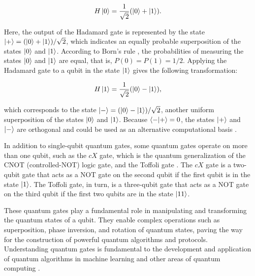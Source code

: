 
\begin{equation}
H\ket{0} = \frac{1}{\sqrt{2}}(\ket{0} + \ket{1}).
\end{equation}

\noindent Here, the output of the Hadamard gate is represented by the state $\ket{+} = (\ket{0} + \ket{1})/\sqrt{2}$, which indicates an equally probable superposition of the states $\ket{0}$ and $\ket{1}$. According to Born's rule \cite{Nielsen}, the probabilities of measuring the states $\ket{0}$ and $\ket{1}$ are equal, that is, $P(0) = P(1) = 1/2$. Applying the Hadamard gate to a qubit in the state $\ket{1}$ gives the following transformation:

\begin{equation}
H\ket{1} = \frac{1}{\sqrt{2}}(\ket{0} - \ket{1}),
\end{equation}

\noindent which corresponds to the state $\ket{-} = (\ket{0} - \ket{1})/\sqrt{2}$, another uniform superposition of the states $\ket{0}$ and $\ket{1}$. Because $\braket{-}{+} = 0$, the states $\ket{+}$ and $\ket{-}$ are orthogonal and could be used as an alternative computational basis \cite{Nielsen}.


In addition to single-qubit quantum gates, some quantum gates operate on more than one qubit, such as the $cX$ gate, which is the quantum generalization of the CNOT (controlled-NOT) logic gate, and the Toffoli gate \cite{Nielsen}. The $cX$ gate is a two-qubit gate that acts as a NOT gate on the second qubit if the first qubit is in the state $\ket{1}$. The Toffoli gate, in turn, is a three-qubit gate that acts as a NOT gate on the third qubit if the first two qubits are in the state $\ket{11}$.

These quantum gates play a fundamental role in manipulating and transforming the quantum states of a qubit. They enable complex operations such as superposition, phase inversion, and rotation of quantum states, paving the way for the construction of powerful quantum algorithms and protocols. Understanding quantum gates is fundamental to the development and application of quantum algorithms in machine learning and other areas of quantum computing \cite{Biamonte2017QML, Wong2022IntroductionClassicalQuantum}.

